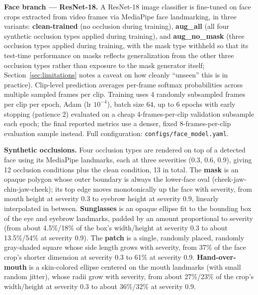 \documentclass[10pt]{article}
\begin{document}
\textbf{Face branch --- ResNet-18.} A ResNet-18 \citep{he2016resnet} image classifier is fine-tuned on face crops extracted from
video frames via MediaPipe face landmarking, in three variants: \textbf{clean-trained} (no occlusion during
training), \textbf{aug\_all} (all four synthetic occlusion types applied during training), and \textbf{aug\_no\_mask}
(three occlusion types applied during training, with the mask type withheld so that its test-time
performance on masks reflects generalization from the other three occlusion types rather than exposure
to the mask generator itself; Section~\ref{sec:limitations} notes a caveat on how cleanly ``unseen'' this is in practice).
Clip-level prediction averages per-frame softmax probabilities across multiple sampled frames per clip.
Training uses 4 randomly subsampled frames per clip per epoch, Adam (lr $10^{-4}$), batch size 64, up
to 6 epochs with early stopping (patience 2) evaluated on a cheap 4-frames-per-clip validation
subsample each epoch; the final reported metrics use a denser, fixed 8-frames-per-clip evaluation
sample instead. Full configuration: \texttt{configs/face\_model.yaml}.

\textbf{Synthetic occlusions.} Four occlusion types are rendered on top of a detected face using its
MediaPipe landmarks, each at three severities (0.3, 0.6, 0.9), giving 12 occlusion conditions plus the
clean condition, 13 in total. The \textbf{mask} is an opaque polygon whose outer boundary is always the
lower-face oval (cheek-jaw-chin-jaw-cheek); its top edge moves monotonically up the face with
severity, from mouth height at severity 0.3 to eyebrow height at severity 0.9, linearly interpolated in
between. \textbf{Sunglasses} is an opaque ellipse fit to the bounding box of the eye and eyebrow
landmarks, padded by an amount proportional to severity (from about 4.5\%/18\% of the box's
width/height at severity 0.3 to about 13.5\%/54\% at severity 0.9). The \textbf{patch} is a single,
randomly placed, randomly gray-shaded square whose side length grows with severity, from 37\% of the
face crop's shorter dimension at severity 0.3 to 61\% at severity 0.9. \textbf{Hand-over-mouth} is a
skin-colored ellipse centered on the mouth landmarks (with small random jitter), whose radii grow with
severity, from about 27\%/23\% of the crop's width/height at severity 0.3 to about 36\%/32\% at
severity 0.9.
\end{document}
